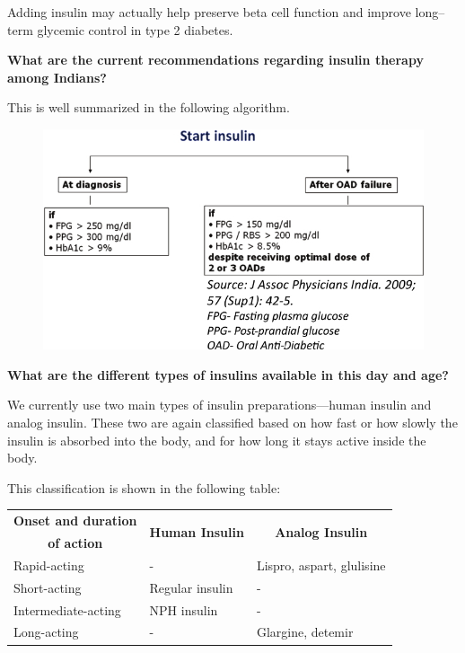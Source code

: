 Adding insulin may actually help preserve beta cell function and improve long–term glycemic control in type 2 diabetes.

\noindent\textbf{What are the current recommendations regarding insulin therapy among Indians?}

This is well summarized in the following algorithm.

\begin{figure}[h]
\centering
\includegraphics[scale=2.3]{images/088.jpg}
\end{figure}

\noindent\textbf{What are the different types of insulins available in this day and age?}

We currently use two main types of insulin preparations—human insulin and analog insulin. These two are again classified based on how fast or how slowly the insulin is absorbed into the body, and for how long it stays active inside the body.

\vskip 5pt

This classification is shown in the following table:

{
\begin{center}
\small\addtolength{\tabcolsep}{-1pt}
\begin{tabular}{|l|l|l|}
\hline
\multicolumn{1}{|c|}{\textbf{Onset and duration}} & \multicolumn{1}{c|}{\multirow{2}{2.3cm}{\textbf{Human Insulin}}} & \multicolumn{1}{c|}{\multirow{2}{2.3cm}{\textbf{Analog Insulin}}}\\
\multicolumn{1}{|c|}{\textbf{of action}} &  & \\
\hline
Rapid-acting & \quad\qquad- & Lispro, aspart, glulisine\\
\hline
Short-acting & Regular insulin & \qquad\qquad-\\
\hline
Intermediate-acting & NPH insulin & \qquad\qquad-\\
\hline
Long-acting & \quad\qquad- & Glargine, detemir\\
\hline
\end{tabular}
\end{center}
}\relax

